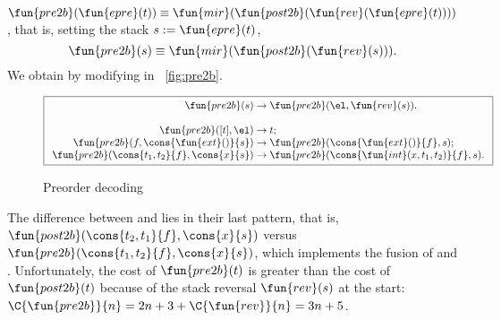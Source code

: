 \(\fun{pre2b}(\fun{epre}(t)) \equiv
\fun{mir}(\fun{post2b}(\fun{rev}(\fun{epre}(t))))\), that is, setting
the stack \(s := \fun{epre}(t)\),
\begin{equation*}
\abovedisplayskip=7pt
\belowdisplayskip=7pt
\fun{pre2b}(s) \equiv \fun{mir}(\fun{post2b}(\fun{rev}(s))).
\end{equation*}
We obtain  by modifying
 in \fig~\vref{fig:pre2b}.
\begin{figure}
\begin{equation*}
\boxed{
\begin{array}{r@{\;}c@{\;}l}
\fun{pre2b}(s) & \rightarrow & \fun{pre2b}(\el,\fun{rev}(s)).\\
\\
\fun{pre2b}([t],\el) & \rightarrow & t;\\
\fun{pre2b}(f,\cons{\fun{ext}()}{s}) & \rightarrow & \fun{pre2b}(\cons{\fun{ext}()}{f},s);\\
\fun{pre2b}(\cons{t_1,t_2}{f},\cons{x}{s}) & \rightarrow &
\fun{pre2b}(\cons{\fun{int}(x,t_1,t_2)}{f},s).
\end{array}}
\end{equation*}
\caption{Preorder decoding}
\label{fig:pre2b}
\end{figure}
The difference between  and
 lies in their last
pattern, that is, \(\fun{post2b}(\cons{t_2,t_1}{f},\cons{x}{s})\)
versus \(\fun{pre2b}(\cons{t_1,t_2}{f},\cons{x}{s})\), which
implements the fusion of  and
. Unfortunately, the cost of \(\fun{pre2b}(t)\)
 is greater than the cost of
\(\fun{post2b}(t)\) because of the stack reversal \(\fun{rev}(s)\) at
the start: \(\C{\fun{pre2b}}{n} = 2n + 3 + \C{\fun{rev}}{n} = 3n +
5\).

